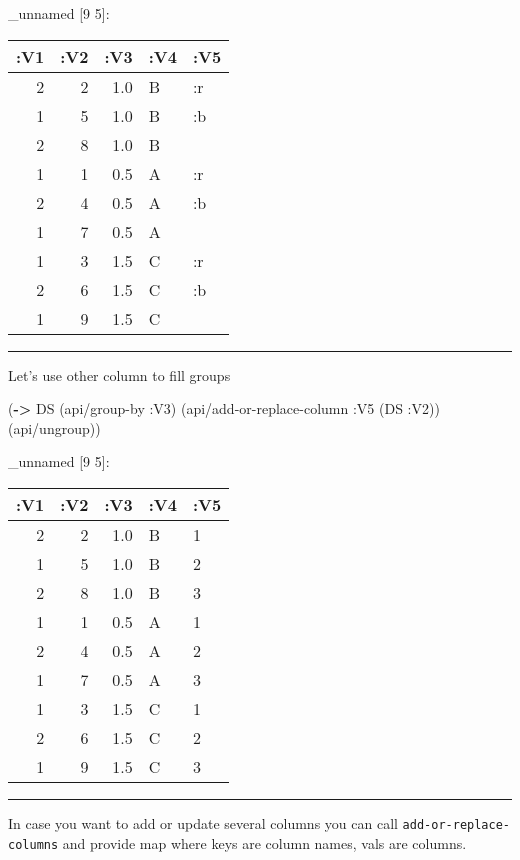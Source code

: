 \documentclass[]{article}
\newenvironment{Shaded}{\begin{snugshade}}{\end{snugshade}}
\newcommand{\KeywordTok}[1]{\textcolor[rgb]{0.13,0.29,0.53}{\textbf{#1}}}
\newcommand{\DecValTok}[1]{\textcolor[rgb]{0.00,0.00,0.81}{#1}}
\newcommand{\VariableTok}[1]{\textcolor[rgb]{0.00,0.00,0.00}{#1}}
\newcommand{\AttributeTok}[1]{\textcolor[rgb]{0.77,0.63,0.00}{#1}}
\newcommand{\NormalTok}[1]{#1}
\begin{document}
\_unnamed {[}9 5{]}:

\begin{longtable}[]{@{}rrrll@{}}
\toprule
:V1 & :V2 & :V3 & :V4 & :V5\tabularnewline
\midrule
\endhead
2 & 2 & 1.0 & B & :r\tabularnewline
1 & 5 & 1.0 & B & :b\tabularnewline
2 & 8 & 1.0 & B &\tabularnewline
1 & 1 & 0.5 & A & :r\tabularnewline
2 & 4 & 0.5 & A & :b\tabularnewline
1 & 7 & 0.5 & A &\tabularnewline
1 & 3 & 1.5 & C & :r\tabularnewline
2 & 6 & 1.5 & C & :b\tabularnewline
1 & 9 & 1.5 & C &\tabularnewline
\bottomrule
\end{longtable}

\begin{center}\rule{0.5\linewidth}{0.5pt}\end{center}

Let's use other column to fill groups

\begin{Shaded}
\begin{Highlighting}[]
\NormalTok{(}\KeywordTok{->}\NormalTok{ DS}
\NormalTok{    (api/group-by }\AttributeTok{:V3}\NormalTok{)}
\NormalTok{    (api/add-or-replace-column }\AttributeTok{:V5}\NormalTok{ (DS }\AttributeTok{:V2}\NormalTok{))}
\NormalTok{    (api/ungroup))}
\end{Highlighting}
\end{Shaded}

\_unnamed {[}9 5{]}:

\begin{longtable}[]{@{}rrrll@{}}
\toprule
:V1 & :V2 & :V3 & :V4 & :V5\tabularnewline
\midrule
\endhead
2 & 2 & 1.0 & B & 1\tabularnewline
1 & 5 & 1.0 & B & 2\tabularnewline
2 & 8 & 1.0 & B & 3\tabularnewline
1 & 1 & 0.5 & A & 1\tabularnewline
2 & 4 & 0.5 & A & 2\tabularnewline
1 & 7 & 0.5 & A & 3\tabularnewline
1 & 3 & 1.5 & C & 1\tabularnewline
2 & 6 & 1.5 & C & 2\tabularnewline
1 & 9 & 1.5 & C & 3\tabularnewline
\bottomrule
\end{longtable}

\begin{center}\rule{0.5\linewidth}{0.5pt}\end{center}

In case you want to add or update several columns you can call
\texttt{add-or-replace-columns} and provide map where keys are column
names, vals are columns.

\begin{Shaded}
\end{Shaded}
\end{document}
